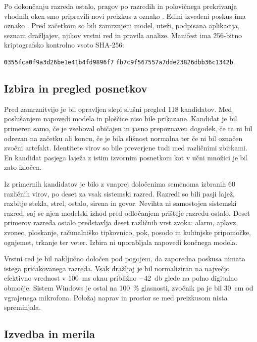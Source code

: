 Po dokončanju razreda ostalo, pragov po razredih in polovičnega prekrivanja
vhodnih oken smo pripravili novi preizkus z oznako
. Edini izvedeni poskus ima oznako
. Pred začetkom so bili zamrznjeni model, uteži, podpisana
aplikacija, seznam dražljajev, njihov vrstni red in pravila analize. Manifest
ima 256-bitno kriptografsko kontrolno vsoto
SHA-256:
\begin{center}
  \small\texttt{0355fca0f9a3d26be1e41b4fd9896f7}\newline
  \texttt{fb7c9f567557a7dde23826dbb36c1342b}.
\end{center}

\subsection{Izbira in pregled posnetkov}

Pred zamrznitvijo je bil opravljen slepi slušni pregled 118 kandidatov. Med
poslušanjem napovedi modela in ploščice niso bile prikazane. Kandidat je bil
primeren samo, če je vseboval običajen in jasno prepoznaven dogodek, če ta ni
bil odrezan na začetku ali koncu, če je bila slišnost normalna ter če ni bil
označen zvočni artefakt. Identitete virov so bile preverjene tudi med
različnimi zbirkami. En kandidat pasjega laježa z istim izvornim posnetkom kot
v učni množici je bil zato izločen.

Iz primernih kandidatov je bilo z vnaprej določenima semenoma izbranih 60
različnih virov, po deset za vsak sistemski razred. Razredi so bili pasji
lajež, razbitje stekla, strel, ostalo, sirena in govor. Nevihta ni samostojen
sistemski razred, saj se njen modelski izhod pred odločanjem prišteje razredu
ostalo. Deset primerov razreda ostalo predstavlja deset različnih vrst zvoka:
alarm, aplavz, zvonec, ploskanje, računalniško tipkovnico, pok, posodo in
kuhinjske pripomočke, ognjemet, trkanje ter veter. Izbira ni uporabljala
napovedi končnega modela.

Vrstni red je bil naključno določen pod pogojem, da zaporedna poskusa nimata
istega pričakovanega razreda. Vsak dražljaj je bil normaliziran na največjo
efektivno vrednost v \SI{100}{\milli\second} oknu približno
\SI{-42}{\decibel} glede na polno digitalno območje. Sistem Windows je ostal
na \SI{100}{\percent} glasnosti, zvočnik pa je bil \SI{30}{\centi\meter} od
vgrajenega mikrofona. Položaj naprav in prostor se med preizkusom nista
spreminjala.

\subsection{Izvedba in merila}

